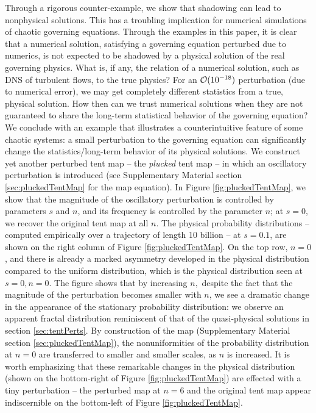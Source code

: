 Through a rigorous counter-example, we show that shadowing can lead
to nonphysical solutions. This has a troubling implication for numerical simulations of chaotic
governing equations.  Through the examples in this paper, it is clear that a numerical solution, satisfying
a governing equation perturbed due to numerics, is not 
expected to be shadowed by a
physical solution of the real governing physics.  What is, if any, the
relation of a numerical solution, such as DNS of turbulent flows, to
the true physics? For an ${\cal O}(10^{-18})$ 
perturbation (due to numerical error), 
we may get completely different statistics from a true, physical solution. How then can we trust numerical solutions when they are not guaranteed to share the long-term statistical behavior of the governing equation? 
We conclude with an example that illustrates a counterintuitive feature of some chaotic systems: a small perturbation to the 
governing equation can significantly change the statistics/long-term 
behavior of its physical solutions. We construct yet another 
perturbed tent map -- the \emph{plucked} 
tent map -- in which an oscillatory perturbation is introduced (see Supplementary Material section \ref{sec:pluckedTentMap} for the map equation). In Figure \ref{fig:pluckedTentMap}, we show that the magnitude of the oscillatory perturbation is controlled by parameters $s$ and $n$, and its frequency is controlled by the parameter $n$; at $s=0$, we recover the original tent map at all $n$. The physical probability distributions -- computed empirically over a trajectory of length 10 billion -- at $s=0.1$, are shown on the right column of Figure \ref{fig:pluckedTentMap}. On the top row, $n=0$, and there is already a marked asymmetry developed in the physical distribution compared to the uniform distribution, which is the physical distribution seen at $s=0, n=0$. The figure shows that by increasing $n,$ despite the fact that the magnitude of the perturbation becomes smaller with $n$, we see a dramatic change in the appearance of the stationary probability distribution: we observe an apparent fractal distribution reminiscent of that of the quasi-physical solutions in 
section \ref{sec:tentPerts}. By construction of the map (Supplementary Material section \ref{sec:pluckedTentMap}), the nonuniformities of the probability distribution at $n=0$ are transferred to smaller and smaller scales, 
as $n$ is increased. It is worth emphasizing that these remarkable changes in the physical distribution (shown on the bottom-right of Figure \ref{fig:pluckedTentMap}) are effected with a tiny perturbation -- the perturbed map at $n=6$ and the original tent map appear indiscernible on the bottom-left of Figure \ref{fig:pluckedTentMap}. 

